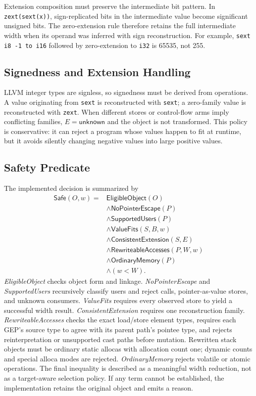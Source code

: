 \documentclass[11pt,twocolumn]{article}
\begin{document}
Extension composition must preserve the intermediate bit pattern. In
\texttt{zext(sext(x))}, sign-replicated bits in the intermediate value become
significant unsigned bits. The zero-extension rule therefore retains the full
intermediate width when its operand was inferred with sign reconstruction.
For example, \texttt{sext i8 -1 to i16} followed by zero-extension to
\texttt{i32} is 65535, not 255.

\subsection{Signedness and Extension Handling}

LLVM integer types are signless, so signedness must be derived from operations.
A value originating from \texttt{sext} is reconstructed with \texttt{sext}; a
zero-family value is reconstructed with \texttt{zext}. When different stores or
control-flow arms imply conflicting families, $E=\mathsf{unknown}$ and the
object is not transformed. This policy is conservative: it can reject a program
whose values happen to fit at runtime, but it avoids silently changing negative
values into large positive values.

\subsection{Safety Predicate}

The implemented decision is summarized by
\begin{align*}
\mathsf{Safe}(O,w) ={}& \mathsf{EligibleObject}(O) \\
&\land \mathsf{NoPointerEscape}(P) \\
&\land \mathsf{SupportedUsers}(P) \\
&\land \mathsf{ValueFits}(S,B,w) \\
&\land \mathsf{ConsistentExtension}(S,E) \\
&\land \mathsf{RewriteableAccesses}(P,W,w) \\
&\land \mathsf{OrdinaryMemory}(P) \\
&\land (w<W).
\end{align*}
\emph{EligibleObject} checks object form and linkage. \emph{NoPointerEscape}
and \emph{SupportedUsers} recursively classify users and reject calls,
pointer-as-value stores, and unknown consumers. \emph{ValueFits} requires every
observed store to yield a successful width result. \emph{ConsistentExtension}
requires one reconstruction family. \emph{RewriteableAccesses} checks the exact
load/store element types, requires each GEP's source type to agree with its
parent path's pointee type, and rejects reinterpretation or unsupported cast
paths before mutation. Rewritten stack objects must be ordinary static allocas
with allocation count one; dynamic counts and special alloca modes are rejected.
\emph{OrdinaryMemory} rejects volatile or atomic operations. The final inequality
is described as a meaningful width reduction, not as a target-aware selection
policy. If any term cannot be established, the implementation retains the
original object and emits a reason.
\end{document}
